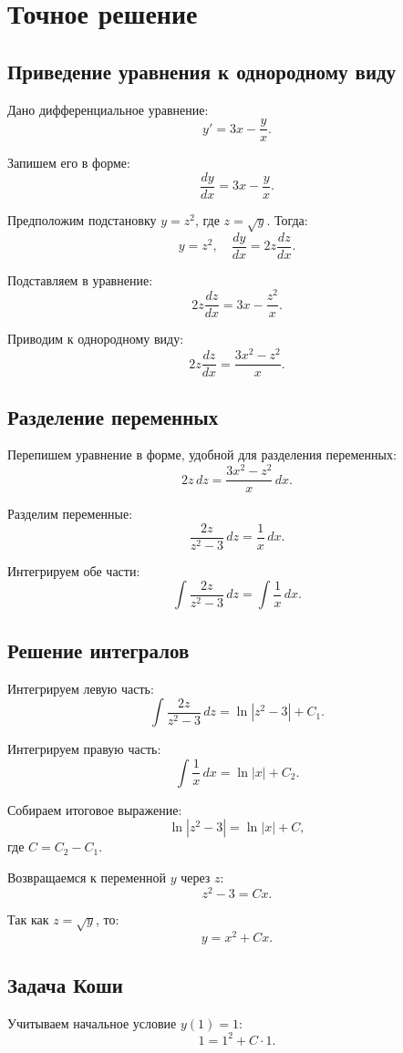 \documentclass[a4paper,12pt]{article}
\begin{document}
\section{Точное решение}

\subsection*{Приведение уравнения к однородному виду}
Дано дифференциальное уравнение:
\[
y' = 3x - \frac{y}{x}.
\]

Запишем его в форме:
\[
\frac{dy}{dx} = 3x - \frac{y}{x}.
\]

Предположим подстановку \( y = z^2 \), где \( z = \sqrt{y} \). Тогда:
\[
y = z^2, \quad \frac{dy}{dx} = 2z \frac{dz}{dx}.
\]

Подставляем в уравнение:
\[
2z \frac{dz}{dx} = 3x - \frac{z^2}{x}.
\]

Приводим к однородному виду:
\[
2z \frac{dz}{dx} = \frac{3x^2 - z^2}{x}.
\]

\subsection*{Разделение переменных}
Перепишем уравнение в форме, удобной для разделения переменных:
\[
2z \, dz = \frac{3x^2 - z^2}{x} \, dx.
\]

Разделим переменные:
\[
\frac{2z}{z^2 - 3} \, dz = \frac{1}{x} \, dx.
\]

Интегрируем обе части:
\[
\int \frac{2z}{z^2 - 3} \, dz = \int \frac{1}{x} \, dx.
\]

\subsection*{Решение интегралов}
Интегрируем левую часть:
\[
\int \frac{2z}{z^2 - 3} \, dz = \ln|z^2 - 3| + C_1.
\]

Интегрируем правую часть:
\[
\int \frac{1}{x} \, dx = \ln|x| + C_2.
\]

Собираем итоговое выражение:
\[
\ln|z^2 - 3| = \ln|x| + C,
\]
где \( C = C_2 - C_1 \).

Возвращаемся к переменной \( y \) через \( z \):
\[
z^2 - 3 = Cx.
\]

Так как \( z = \sqrt{y} \), то:
\[
y = x^2 + Cx.
\]

\subsection*{Задача Коши}
Учитываем начальное условие \( y(1) = 1 \):
\[
1 = 1^2 + C \cdot 1.
\]
\end{document}
